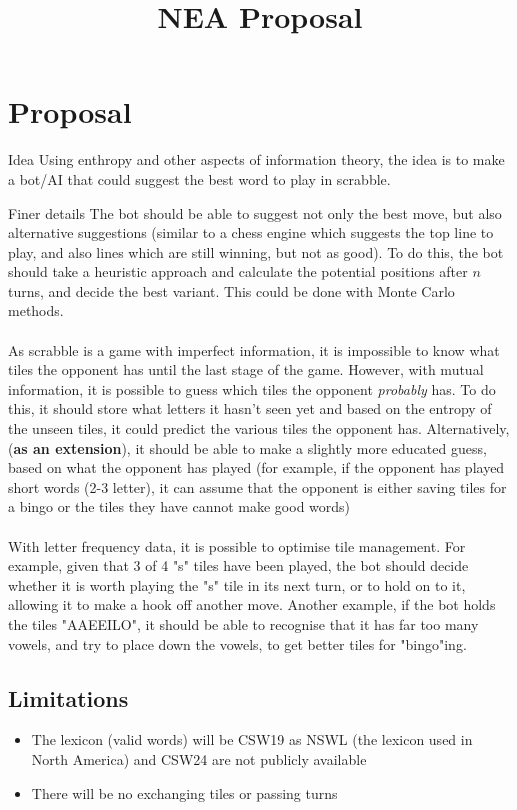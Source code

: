 \documentclass{article}
\title{NEA Proposal}
\begin{document}
\maketitle
\newpage

\section{Proposal}
\huge{Idea}
\newline
\normalsize{Using enthropy and other aspects of information theory, the idea is to make a bot/AI that could suggest the best word to play in scrabble. \\}

\large{Finer details}
\newline
\normalsize{The bot should be able to suggest not only the best move, but also alternative suggestions (similar to a chess engine which suggests the top line to play, and also lines which are still winning, but not as good). To do this, the bot should take a heuristic approach and calculate the potential positions after $n$ turns, and decide the best variant. This could be done with Monte Carlo methods.\\\\As scrabble is a game with imperfect information, it is impossible to know what tiles the opponent has until the last stage of the game. However, with mutual information, it is possible to guess which tiles the opponent \textit{probably} has. To do this, it should store what letters it hasn't seen yet and based on the entropy of the unseen tiles, it could predict the various tiles the opponent has. Alternatively, (\textbf{as an extension}), it should be able to make a slightly more educated guess, based on what the opponent has played (for example, if the opponent has played short words (2-3 letter), it can assume that the opponent is either saving tiles for a bingo or the tiles they have cannot make good words)\\\\With letter frequency data, it is possible to optimise tile management. For example, given that 3 of 4 "s" tiles have been played, the bot should decide whether it is worth playing the "s" tile in its next turn, or to hold on to it, allowing it to make a hook off another move. Another example, if the bot holds the tiles "AAEEILO", it should be able to recognise that it has far too many vowels, and try to place down the vowels, to get better tiles for "bingo"ing.} 
\subsection{Limitations}
\begin{itemize}
    \item The lexicon (valid words) will be CSW19 as NSWL (the lexicon used in North America) and CSW24 are not publicly available
    \item There will be no exchanging tiles or passing turns  
\end{itemize}
\newpage
\end{document}
